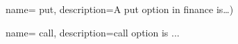 
\usepackage[toc]{glossaries}

\makenoidxglossaries


{
    name= {put}, %
    description={A put option in finance is\dots)}
}



{
    name= {call},
    description={call option is ...}
}


\renewcommand{\glstextformat}[1]{\color{blue}  #1}
